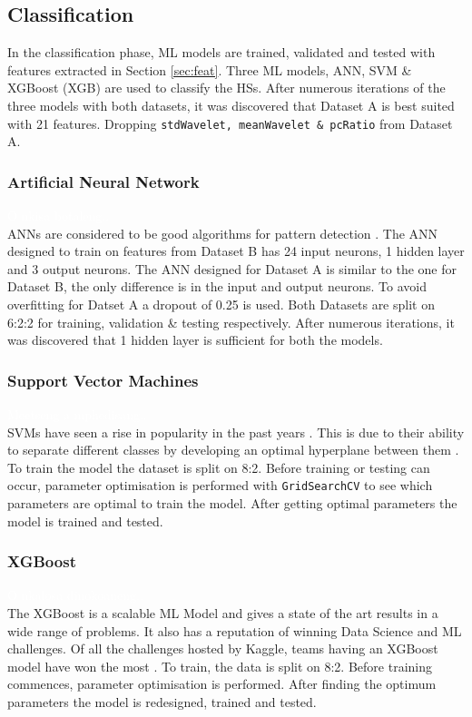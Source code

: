 \documentclass[10pt,twocolumn]{witseiepaper}
\begin{document}
\subsection{Classification}
In the classification phase, ML models are trained, validated and tested with features extracted in Section \ref{sec:feat}. Three ML models, ANN, SVM \& XGBoost (XGB) are used to classify the HSs. After numerous iterations of the three models with both datasets, it was discovered that Dataset A is best suited with 21 features. Dropping \texttt{stdWavelet, meanWavelet \& pcRatio} from Dataset A.

\subsubsection{Artificial Neural Network}
\textcolor{white}{O nkisa botaleng..}\\
ANNs are considered to be good algorithms for pattern detection \cite{3}. The ANN designed to train on features from Dataset B has 24 input neurons, 1 hidden layer and 3 output neurons. The ANN designed for Dataset A is similar to the one for Dataset B, the only difference is in the input and output neurons. To avoid overfitting for Datset A a dropout of 0.25 is used. Both Datasets are split on 6:2:2 for training, validation \& testing respectively. After numerous iterations, it was discovered that 1 hidden layer is sufficient for both the models.

\subsubsection{Support Vector Machines}
\textcolor{white}{Meetseng a mphedisang..}\\
SVMs have seen a rise in popularity in the past years \cite{5}. This is due to their ability to separate different classes by developing an optimal hyperplane between them \cite{22}. To train the model the dataset is split on 8:2. Before training or testing can occur, parameter optimisation is performed with \texttt{GridSearchCV} to see which parameters are optimal to train the model. After getting optimal parameters the model is trained and tested.

\subsubsection{XGBoost}
\textcolor{white}{O nkalosa dinokoaneng..}\\
The XGBoost is a scalable ML Model and gives a state of the art results in a wide range of problems. It also has a reputation of winning Data Science and ML challenges. Of all the challenges hosted by Kaggle, teams having an XGBoost model have won the most \cite{45}. To train, the data is split on 8:2. Before training commences, parameter optimisation is performed. After finding the optimum parameters the model is redesigned, trained and tested.
\end{document}

